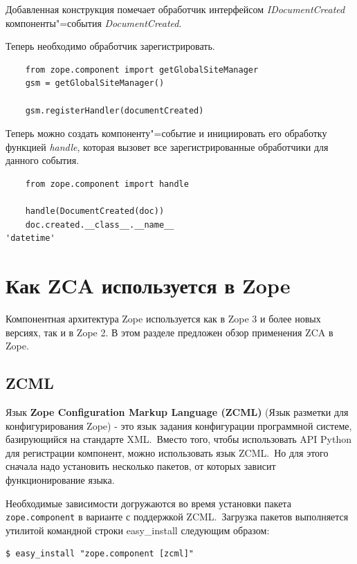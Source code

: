 \documentclass[a4paper,openany,twoside,draft]{book}
\providecommand*{\DUroletitlereference}[1]{\textsl{#1}}
\begin{document}
Добавленная конструкция помечает обработчик интерфейсом \DUroletitlereference{IDocumentCreated} компоненты"=события \DUroletitlereference{DocumentCreated}.

Теперь необходимо обработчик зарегистрировать.

\begin{verbatim}
    from zope.component import getGlobalSiteManager
    gsm = getGlobalSiteManager()

    gsm.registerHandler(documentCreated)
\end{verbatim}

Теперь можно создать компоненту"=событие и инициировать его обработку функцией \DUroletitlereference{handle}, которая вызовет все зарегистрированные обработчики для данного события.

\begin{verbatim}
    from zope.component import handle

    handle(DocumentCreated(doc))
    doc.created.__class__.__name__
'datetime'
\end{verbatim}


\chapter{Как ZCA используется в Zope%
  \label{zca-zope}%
}

Компонентная архитектура Zope используется как в Zope 3 и более новых версиях, так и в Zope 2.  В этом разделе предложен обзор применения ZCA в Zope.


\section{ZCML%
  \label{zcml}%
}

Язык \textbf{Zope Configuration Markup Language (ZCML)} (Язык разметки для конфигурирования Zope) - это язык задания конфигурации программной системе, базирующийся на стандарте XML.~Вместо того, чтобы использовать API Python для регистрации компонент, можно использовать язык ZCML.~Но для этого сначала надо установить несколько пакетов, от которых зависит функционирование языка.

Необходимые зависимости догружаются во время установки пакета \texttt{zope.component} в варианте с поддержкой ZCML.~Загрузка пакетов выполняется утилитой командной строки easy\_install следующим образом:

\begin{verbatim}
$ easy_install "zope.component [zcml]"
\end{verbatim}
\end{document}

